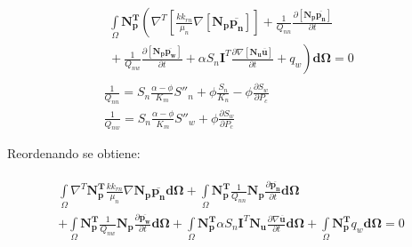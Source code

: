 \begin{ceqn} 
\begin{subequations} \label{eq:equ370} 
\begin{gather}
\begin{multlined}
\int\limits_\Omega \mathbf{N_{p}^T}\left( \nabla^T \left[\frac{k k_{rn}}{\mu_{n}}\nabla [\mathbf{N_p}\mathbf{\overline{p_n}}] \right] + \frac{1}{Q_{nn}}\frac{\partial [\mathbf{N_p}\mathbf{\overline{p_n}}]}{\partial t} \right. \\[12pt]
\left. {} + \frac{1}{Q_{nw}}\frac{\partial [\mathbf{N_p}\mathbf{\overline{p_w}}]}{\partial t} +\alpha S_n\mathbf{I}^T\frac{\partial \nabla [\mathbf{N_u}\mathbf{\overline{u}}]}{\partial t} + q_w\right) \mathbf{d\Omega} = 0 \end{multlined}\label{eq:equ370a}\\[12pt]
\frac{1}{Q_{nn}} = S_n \frac{\alpha - \phi}{K_m}S''_n + \phi\frac{S_n}{K_n} - \phi\frac{\partial S_w}{\partial P_c} \label{eq:equ70b}\\[12pt]
\frac{1}{Q_{nw}} = S_n \frac{\alpha - \phi}{K_m}S''_w + \phi\frac{\partial S_w}{\partial P_c} \label{eq:equ70c}
\end{gather}  
\end{subequations} 
\end{ceqn}

\bigskip
Reordenando se obtiene:

\begin{ceqn} 
\begin{gather} \label{eq:equ371} 
\begin{multlined}
\int\limits_\Omega \nabla^T\mathbf{N_{p}^T} \frac{k k_{rn}}{\mu_{n}}\nabla \mathbf{N_p}\mathbf{\overline{p_n}} \mathbf{d\Omega}  + \int\limits_\Omega \mathbf{N_{p}^T}\frac{1}{Q_{nn}}\mathbf{N_p}\frac{\partial \mathbf{\overline{p_n}}}{\partial t}\mathbf{d\Omega}\\[12pt] 
+ \int\limits_\Omega \mathbf{N_{p}^T}\frac{1}{Q_{nw}}\mathbf{N_p}\frac{\partial \mathbf{\overline{p_w}}}{\partial t}\mathbf{d\Omega} + \int\limits_\Omega \mathbf{N_{p}^T}\alpha S_n\mathbf{I}^T\mathbf{N_u}\frac{\partial \nabla \mathbf{\overline{u}}}{\partial t}\mathbf{d\Omega} + \int\limits_\Omega \mathbf{N_{p}^T}q_w \mathbf{d\Omega} = 0
\end{multlined}
\end{gather} 
\end{ceqn}

